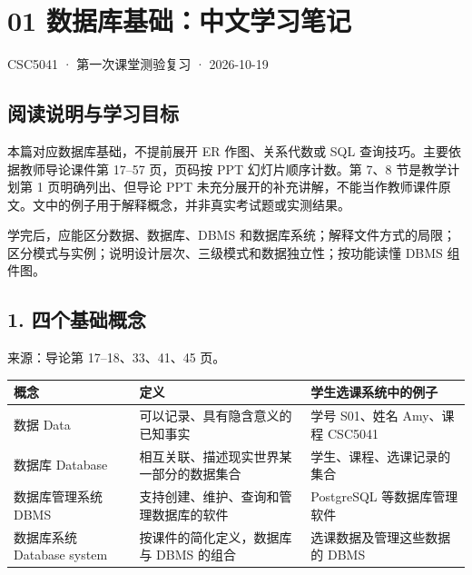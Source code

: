 \clearpage
\section{01 数据库基础：中文学习笔记}\label{01_database_fundamentals_zh}

CSC5041 · 第一次课堂测验复习 · 2026-10-19

\subsection{阅读说明与学习目标}\label{01_database_fundamentals_zh-ux9605ux8bfbux8bf4ux660eux4e0eux5b66ux4e60ux76eeux6807}

本篇对应数据库基础，不提前展开 ER 作图、关系代数或 SQL 查询技巧。主要依据教师导论课件第 17--57 页，页码按 PPT 幻灯片顺序计数。第 7、8 节是教学计划第 1 页明确列出、但导论 PPT 未充分展开的补充讲解，不能当作教师课件原文。文中的例子用于解释概念，并非真实考试题或实测结果。

学完后，应能区分数据、数据库、DBMS 和数据库系统；解释文件方式的局限；区分模式与实例；说明设计层次、三级模式和数据独立性；按功能读懂 DBMS 组件图。

\subsection{1. 四个基础概念}\label{01_database_fundamentals_zh-ux56dbux4e2aux57faux7840ux6982ux5ff5}

来源：导论第 17--18、33、41、45 页。

\begin{longtable}[]{@{}
  >{\raggedright\arraybackslash}p{}
  >{\raggedright\arraybackslash}p{}
  >{\raggedright\arraybackslash}p{}@{}}
\toprule\noalign{}
\begin{minipage}[b]{\linewidth}\raggedright
概念
\end{minipage} & \begin{minipage}[b]{\linewidth}\raggedright
定义
\end{minipage} & \begin{minipage}[b]{\linewidth}\raggedright
学生选课系统中的例子
\end{minipage} \\
\midrule\noalign{}
\endhead
\bottomrule\noalign{}
\endlastfoot
数据 Data & 可以记录、具有隐含意义的已知事实 & 学号 S01、姓名 Amy、课程 CSC5041 \\
数据库 Database & 相互关联、描述现实世界某一部分的数据集合 & 学生、课程、选课记录的集合 \\
数据库管理系统 DBMS & 支持创建、维护、查询和管理数据库的软件 & PostgreSQL 等数据库管理软件 \\
数据库系统 Database system & 按课件的简化定义，数据库与 DBMS 的组合 & 选课数据及管理这些数据的 DBMS \\
\end{longtable}

